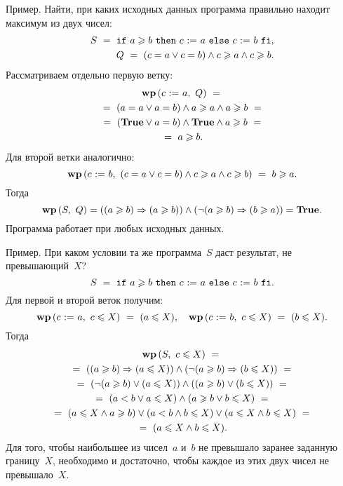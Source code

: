 \documentclass[landscape]{slides}
\begin{document}
\begin{slide}
        Пример. Найти, при каких исходных данных программа правильно находит максимум из двух чисел:
        \begin{eqnarray*}
                S\ =\ \mathtt{if}\ {a\geqslant b}\ \mathtt{then}\ {c\ \mathtt{:=}\  a}\ \mathtt{else}\ {c\ \mathtt{:=}\  b}\ \mathtt{fi},\\
                Q\ =\ (c=a\lor c=b)\land c\geqslant a \land c\geqslant b .
        \end{eqnarray*}
        Рассматриваем отдельно первую ветку:
        \begin{multline*}
                \wpof{c\assign a}{Q}\ ={}\\
                {}=\ (a=a\lor a=b)\land a\geqslant a \land a\geqslant b\ ={}\\
                {}=\ (\true\lor a=b)\land \true \land a\geqslant b\ ={}\\
                {}=\ a\geqslant b .
        \end{multline*}
        Для второй ветки аналогично:
        \[
                \mathbf{wp}\left({c\ \mathtt{:=}\  b},\ {(c=a\lor c=b)\land c\geqslant a \land c\geqslant b}\right)\ =\ b\geqslant a .
        \]
        Тогда
        \[
                \mathbf{wp}\left({S},\ {Q}\right) = ((a\geqslant b)\Rightarrow(a\geqslant b)) \land (\neg(a\geqslant b)\Rightarrow(b\geqslant a)) = \mathbf{True} .
        \]
        Программа работает при любых исходных данных.
\end{slide}

\begin{slide}
Пример. При каком условии та же программа~$S$ даст результат, не превышающий~$X$?
        \[
                S\ =\ \mathtt{if}\ {a\geqslant b}\ \mathtt{then}\ {c\ \mathtt{:=}\  a}\ \mathtt{else}\ {c\ \mathtt{:=}\  b}\ \mathtt{fi}.
        \]
        Для первой и второй веток получим:
        \[
                \mathbf{wp}\left({c\ \mathtt{:=}\  a},\ {c \leqslant X}\right)\ =\ (a \leqslant X),
                \quad
                \mathbf{wp}\left({c\ \mathtt{:=}\  b},\ {c \leqslant X}\right)\ =\ (b \leqslant X).
        \]
        Тогда
        \begin{multline*}
                \mathbf{wp}\left({S},\ {c \leqslant X}\right)\ ={}\\
                {}=\ ((a\geqslant b)\Rightarrow(a \leqslant X)) \land (\neg(a\geqslant b)\Rightarrow(b \leqslant X))\ ={}\\
                {}=\ (\neg(a\geqslant b)\lor(a \leqslant X)) \land ((a\geqslant b)\lor(b \leqslant X))\ ={}\\
                {}=\ (a<b \lor a \leqslant X) \land (a\geqslant b \lor b \leqslant X)\ ={}\\
                {}=\ (a \leqslant X \land a\geqslant b) \lor (a<b \land b\leqslant X) \lor (a \leqslant X \land b \leqslant X)\ ={}\\
                {}=\ (a \leqslant X \land b \leqslant X).
        \end{multline*}
        Для того, чтобы наибольшее из чисел~$a$ и~$b$ не превышало заранее заданную границу~$X$, необходимо и достаточно, чтобы каждое из этих двух чисел не превышало~$X$.
\end{slide}
\end{document}
